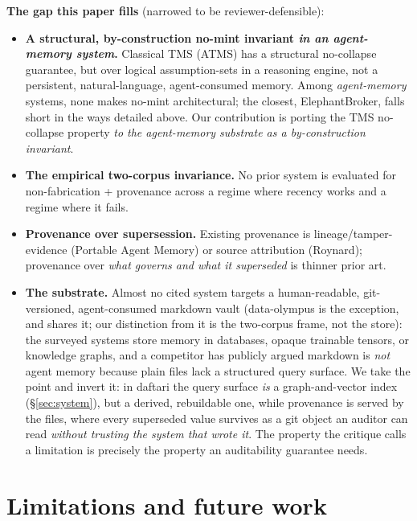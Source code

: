 \documentclass[11pt]{article}
\begin{document}
\textbf{The gap this paper fills} (narrowed to be reviewer-defensible):
\begin{itemize}
\item \textbf{A structural, by-construction no-mint invariant \emph{in an agent-memory system}.} Classical
  TMS (ATMS) has a structural no-collapse guarantee, but over logical assumption-sets in a
  reasoning engine, not a persistent, natural-language, agent-consumed memory. Among
  \emph{agent-memory} systems, none makes no-mint architectural; the closest, ElephantBroker,
  falls short in the ways detailed above. Our contribution is porting the TMS no-collapse
  property \emph{to the agent-memory substrate as a by-construction invariant}.
\item \textbf{The empirical two-corpus invariance.} No prior system is evaluated for non-fabrication +
  provenance across a regime where recency works and a regime where it fails.
\item \textbf{Provenance over supersession.} Existing provenance is lineage/tamper-evidence (Portable
  Agent Memory) or source attribution (Roynard); provenance over \emph{what governs and what it
  superseded} is thinner prior art.
\item \textbf{The substrate.} Almost no cited system targets a human-readable, git-versioned, agent-consumed
  markdown vault (data-olympus is the exception, and shares it; our distinction from it is the
  two-corpus frame, not the store): the surveyed systems store memory in databases, opaque trainable tensors,
  or knowledge graphs, and a competitor has publicly argued markdown is \emph{not} agent memory
  \citep{zep2026markdown} because plain files lack a structured query surface. We take the point and
  invert it: in daftari the query surface \emph{is} a graph-and-vector index (\S\ref{sec:system}), but a derived,
  rebuildable one, while provenance is served by the files, where every superseded value
  survives as a git object an auditor can read \emph{without trusting the system that wrote it}.
  The property the critique calls a limitation is precisely the property an auditability
  guarantee needs.
\end{itemize}

\section{Limitations and future work}
\label{sec:limitations}
\end{document}
